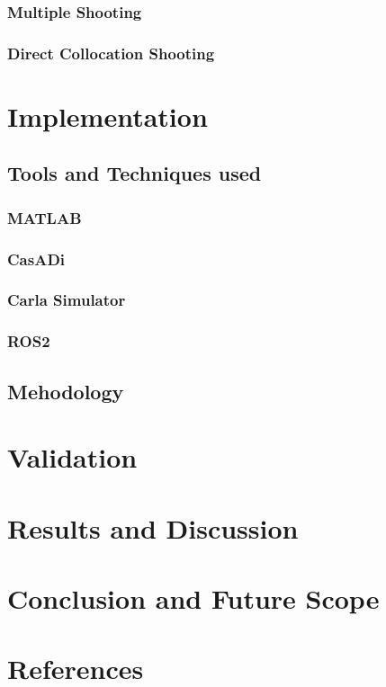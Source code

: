 \documentclass{article}
\begin{document}
\begin{titlepage}
    \subsubsection{Multiple Shooting}
    \subsubsection{Direct Collocation Shooting}

    \section{Implementation}
    \subsection{Tools and Techniques used}
    \subsubsection{MATLAB}
    \subsubsection{CasADi}
    \subsubsection{Carla Simulator}
    \subsubsection{ROS2}
    \subsection{Mehodology}

    \section{Validation}

    \section{Results and Discussion}

    \section{Conclusion and Future Scope}

    \section{References}


\end{titlepage}
\end{document}
